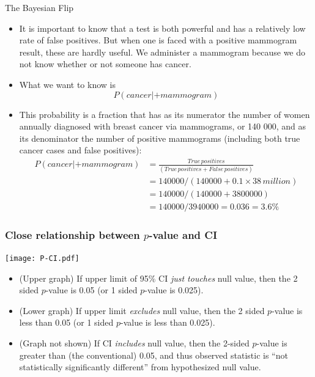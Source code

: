 \documentclass[10pt,handout]{beamer}\usepackage[]{graphicx}\usepackage[]{color}
\begin{document}
\begin{frame}{The Bayesian Flip}
	
	\begin{itemize}
		\item It is important to know that
		a test is both powerful and has a relatively low
		rate of false positives. But when one is faced
		with a positive mammogram result, these are
		hardly useful. We administer a mammogram
		because we do not know whether or not
		someone has cancer.
		\item What we want to know is
		$$P(cancer | +mammogram)$$ \pause 
		\item This probability is a fraction
		that has as its numerator the number of
		women annually diagnosed with breast
		cancer via mammograms, or 140 000, and
		as its denominator the number of positive
		mammograms (including both true cancer
		cases and false positives):
		\begin{align*}
			P(cancer | +mammogram) &= \frac{True\, positives}{(True\,positives + False\, positives)} \\
			&= 140 000 / (140 000 + 0.1 × 38\,million)
			\\
			&= 140 000 / (140 000 + 3 800 000)
			\\
			&= 140 000 / 3 940 000 = 0.036 = 3.6\%
		\end{align*}
	\end{itemize}
	
\end{frame}




\begin{frame}
	\frametitle{Close relationship between $p$-value and CI}
	\begin{center}
		\texttt{[image: P-CI.pdf]}
	\end{center} 
	\begin{footnotesize}
		\begin{itemize}
			\item
			(Upper graph) If upper limit of 95\% CI\textit{ just touches} null value, then
			the 2 sided $p$-value is 0.05 (or 1 sided $p$-value is 0.025). 
			\item
			(Lower graph) If upper limit \textit{excludes} null value, then
			the 2 sided $p$-value is less than 0.05 (or 1 sided $p$-value is less than 0.025). 
			\item
			(Graph not shown) If  CI \textit{includes} null value, then the 2-sided $p$-value is greater than (the conventional) 0.05, and thus observed statistic is ``not statistically significantly different'' from hypothesized null value. 
		\end{itemize}
	\end{footnotesize}
\end{frame}
\end{document}
